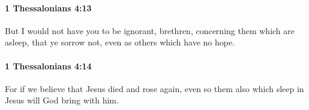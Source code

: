 		\paragraph{1 Thessalonians 4:13} %
			\label{1THESSALONIANS-4-13}

			But I would not have you to be ignorant, brethren, concerning them which are asleep, that ye sorrow not, even as others which have no hope.

			\begin{framed}
			\scriptsize
				\begin{compactdesc}
					\item[SBLG] 
				\end{compactdesc}
			\end{framed}

		\paragraph{1 Thessalonians 4:14} %
			\label{1THESSALONIANS-4-14}

			For if we believe that Jesus died and rose again, even so them also which sleep in Jesus will God bring with him.

